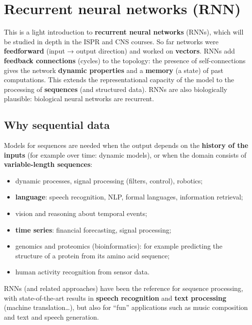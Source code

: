 \chapter{Recurrent neural networks (RNN)}\label{ch-20}

This is a light introduction to \textbf{recurrent neural networks}
(RNNs), which will be studied in depth in the ISPR and CNS courses. So
far networks were \textbf{feedforward} (input → output direction) and
worked on \textbf{vectors}. RNNs add \textbf{feedback connections}
(cycles) to the topology: the presence of self-connections gives the
network \textbf{dynamic properties} and a \textbf{memory} (a state) of
past computations. This extends the representational capacity of the
model to the processing of \textbf{sequences} (and structured data).
RNNs are also biologically plausible: biological neural networks are
recurrent.

\section{Why sequential data}\label{perchuxe9-i-dati-sequenziali}

Models for sequences are needed when the output depends on the
\textbf{history of the inputs} (for example over time: dynamic models),
or when the domain consists of \textbf{variable-length sequences}:

\begin{itemize}
\tightlist
\item
  dynamic processes, signal processing (filters, control), robotics;
\item
  \textbf{language}: speech recognition, NLP, formal languages,
  information retrieval;
\item
  vision and reasoning about temporal events;
\item
  \textbf{time series}: financial forecasting, signal processing;
\item
  genomics and proteomics (bioinformatics): for example predicting the
  structure of a protein from its amino acid sequence;
\item
  human activity recognition from sensor data.
\end{itemize}

RNNs (and related approaches) have been the reference for sequence
processing, with state-of-the-art results in \textbf{speech
recognition} and \textbf{text processing} (machine translation\ldots),
but also for ``fun'' applications such as music composition and text
and speech generation.

